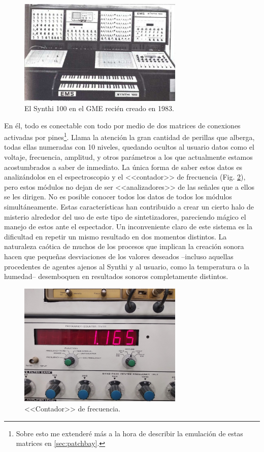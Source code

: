 \begin{figure}
	\centering
	\includegraphics[width=0.7\textwidth]{synthi_1984}
	\caption[El Synthi 100 en el GME recién creado en 1983.]{El Synthi 100 en el GME recién creado en 1983.}
	\label{fig:synthi_1984}
\end{figure}

En él, todo es conectable con todo por medio de dos matrices de conexiones activadas por pines\footnote{Sobre esto me extenderé más a la hora de describir la emulación de estas matrices en \ref{sec:patchbay}.}. Llama la atención la gran cantidad de perillas que alberga, todas ellas numeradas con 10 niveles, quedando ocultos al usuario datos como el voltaje, frecuencia, amplitud, y otros parámetros a los que actualmente estamos acostumbrados a saber de inmediato. La única forma de saber estos datos es analizándolos en el espectroscopio y el <<contador>> de frecuencia (Fig. \ref{fig:frequency_counter}), pero estos módulos no dejan de ser <<analizadores>> de las señales que a ellos se les dirigen. No es posible conocer todos los datos de todos los módulos simultáneamente. Estas características han contribuido a crear un cierto halo de misterio alrededor del uso de este tipo de sintetizadores, pareciendo mágico el manejo de estos ante el espectador. Un inconveniente claro de este sistema es la dificultad en repetir un mismo resultado en dos momentos distintos. La naturaleza caótica de muchos de los procesos que implican la creación sonora hacen que pequeñas desviaciones de los valores deseados --incluso aquellas procedentes de agentes ajenos al Synthi y al usuario, como la temperatura o la humedad-- desemboquen en resultados sonoros completamente distintos.

\begin{figure}
	\centering
	\includegraphics[width=0.7\textwidth]{frequency_counter}
	\caption[<<Contador>> de frecuencia.]{<<Contador>> de frecuencia.}
	\label{fig:frequency_counter}
\end{figure}


